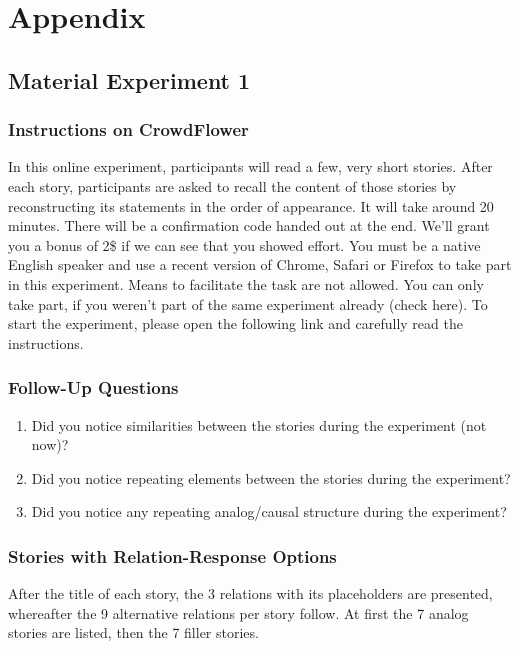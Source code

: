 \section{Appendix}
\subsection{Material Experiment 1}
\subsubsection{Instructions on CrowdFlower}
In this online experiment, participants will read a few, very short stories. After each story, participants are asked to recall the content of those stories by reconstructing its statements in the order of appearance.
It will take around 20 minutes. There will be a confirmation code handed out at the end. We'll grant you a bonus of 2\$ if we can see that you showed effort. You must be a native English speaker and use a recent version of Chrome, Safari or Firefox to take part in this experiment. Means to facilitate the task are not allowed. You can only take part, if you weren't part of the same experiment already (check here).
To start the experiment, please open the following link and carefully read the instructions.

\subsubsection{Follow-Up Questions}
\begin{enumerate}
  \item Did you notice similarities between the stories during the experiment (not now)?
  \item Did you notice repeating elements between the stories during the experiment?
  \item Did you notice any repeating analog/causal structure during the experiment?
\end{enumerate}

\subsubsection{Stories with Relation-Response Options}
After the title of each story, the 3 relations with its placeholders are presented, whereafter the 9 alternative relations per story follow. At first the 7 analog stories are listed, then the 7 filler stories.

